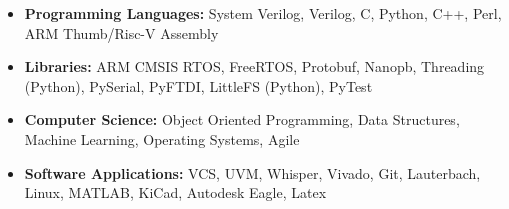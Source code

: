 \documentclass[../main.tex]{subfiles}
\begin{document}
\vspace{-\topsep}
\begin{itemize}
  \setlength{\itemindent}{-6mm}
  \vspace{\listItemDist}\item {\fontsize{\textFontSize}{\textFontBox}\selectfont \textbf{Programming Languages:} System Verilog, Verilog, C, Python, C++, Perl, ARM Thumb/Risc-V Assembly}
  \vspace{-0.4cm}\item {\fontsize{\textFontSize}{\textFontBox}\selectfont \textbf{Libraries:} ARM CMSIS RTOS, FreeRTOS, Protobuf, Nanopb, Threading (Python), PySerial, PyFTDI, LittleFS (Python), PyTest}
  \vspace{-0.4cm}\item {\fontsize{\textFontSize}{\textFontBox}\selectfont \textbf{Computer Science:} Object Oriented Programming, Data Structures, Machine Learning, Operating Systems, Agile}
  \vspace{-0.4cm}\item {\fontsize{\textFontSize}{\textFontBox}\selectfont \textbf{Software Applications:} VCS, UVM, Whisper, Vivado, Git, Lauterbach, Linux, MATLAB, KiCad, 
  Autodesk Eagle, Latex}
\end{itemize}
\end{document}
